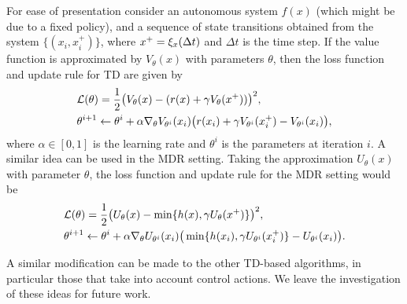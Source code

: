 For ease of presentation consider an autonomous system $f(x)$ (which might be due to a fixed policy), and a sequence of state transitions obtained from the system $\{(x_i,x_i^+)\}$, where $x^+=\xi_x(\Delta t)$ and $\Delta t$ is the time step. If the value function is approximated by $V_\theta(x)$ with parameters $\theta$, then the loss function and update rule for TD are given by
%
\begin{equation}
\begin{split}
&\mathcal{L}(\theta)=\frac{1}{2}\big(V_{\theta}(x) - (r(x)+\gamma V_{\theta}(x^+))\big)^2 ,\\
&\theta^{i+1} \leftarrow \theta^i + \alpha \nabla_{\theta}V_{\theta^i}(x_i)\big(r(x_i)+\gamma V_{\theta^i}(x^+_i) - V_{\theta^i}(x_i)\big),
\end{split}
\end{equation}%
\noindent where $\alpha \in [0,1]$ is the learning rate and $\theta^i$ is the parameters at iteration $i$. A similar idea can be used in the MDR setting. Taking the approximation $U_\theta(x)$ with parameter $\theta$, the loss function and update rule for the MDR setting would be
%
\begin{equation}
\begin{split}
&\mathcal{L}(\theta)=\frac{1}{2}\big(U_{\theta}(x) - \min\{h(x),\gamma U_{\theta}(x^+)\}\big)^2,\\
&\theta^{i+1} \leftarrow \theta^i + \alpha\nabla_{\theta}U_{\theta^i}(x_i)\big(\min\{h(x_i),\gamma U_{\theta^i}(x^+_i)\} - U_{\theta^i}(x_i)\big).
\end{split}
\end{equation}

A similar modification can be made to the other TD-based algorithms, in particular those that take into account control actions. We leave the investigation of these ideas for future work. 




